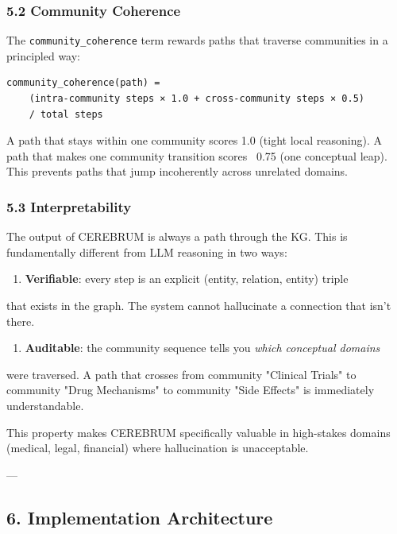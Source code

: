 \documentclass[10pt,journal,compsoc]{IEEEtran}
\begin{document}
\subsubsection{5.2 Community Coherence}

The \texttt{community\_coherence} term rewards paths that traverse communities in a
principled way:

\begin{lstlisting}
community_coherence(path) =
    (intra-community steps × 1.0 + cross-community steps × 0.5)
    / total steps
\end{lstlisting}

A path that stays within one community scores 1.0 (tight local reasoning).
A path that makes one community transition scores ~0.75 (one conceptual leap).
This prevents paths that jump incoh\-erently across unrelated domains.

\subsubsection{5.3 Interp\-retability}

The output of CEREBRUM is always a path through the KG. This is funda\-mentally
different from LLM reasoning in two ways:

\begin{enumerate}
\item \textbf{Verifiable}: every step is an explicit (entity, relation, entity) triple
\end{enumerate}
   that exists in the graph. The system cannot hallucinate a connection that
   isn't there.

\begin{enumerate}
\item \textbf{Auditable}: the community sequence tells you \textit{which conceptual domains}
\end{enumerate}
   were traversed. A path that crosses from community "Clinical Trials" to
   community "Drug Mechanisms" to community "Side Effects" is immediately
   under\-standable.

This property makes CEREBRUM speci\-fically valuable in high-stakes domains
(medical, legal, financial) where hallu\-cination is unacc\-eptable.

---

\subsection{6. Implem\-entation Archit\-ecture}
\end{document}

